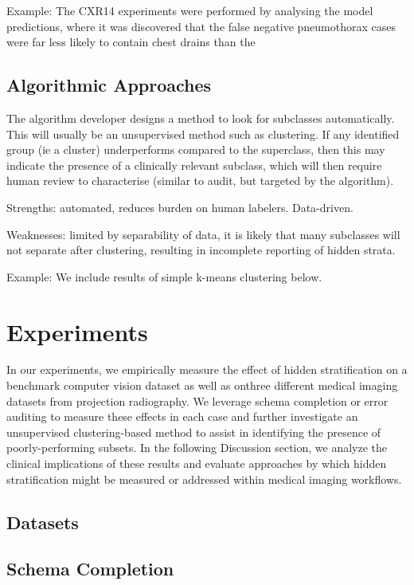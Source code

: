 \documentclass{article}
\begin{document}
Example: The CXR14 experiments were performed by analysing the model predictions, where it was discovered that the false negative pneumothorax cases were far less likely to contain chest drains than the

\subsection{Algorithmic Approaches}
The algorithm developer designs a method to look for subclasses automatically. 
This will usually be an unsupervised method such as clustering. If any identified group (ie a cluster) underperforms compared to the superclass, then this may indicate the presence of a clinically relevant subclass, which will then require human review to characterise (similar to audit, but targeted by the algorithm). 

Strengths: automated, reduces burden on human labelers. Data-driven.

Weaknesses: limited by separability of data, it is likely that many subclasses will not separate after clustering, resulting in incomplete reporting of hidden strata.

Example: We include results of simple k-means clustering below.

\section{Experiments}

In our experiments, we empirically measure the effect of hidden stratification on a benchmark computer vision dataset as well as onthree different medical imaging datasets from projection radiography.  We leverage schema completion or error auditing to measure these effects in each case and further investigate an unsupervised clustering-based method to assist in identifying the presence of poorly-performing subsets.  In the following Discussion section, we analyze the clinical implications of these results and evaluate approaches by which hidden stratification might be measured or addressed within medical imaging workflows.

\subsection{Datasets}

\subsection{Schema Completion}
\end{document}
